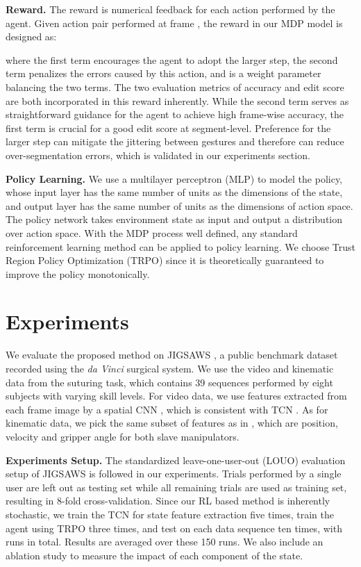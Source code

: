 \documentclass{llncs}
\begin{document}
\textbf{Reward.} The reward is numerical feedback for each action performed by the agent. Given action pair  performed at frame , the reward in our MDP model is designed as: 

where the first term encourages the agent to adopt the larger step, the second term penalizes the errors caused by this action, and  is a weight parameter balancing the two terms. The two evaluation metrics of accuracy and edit score are both incorporated in this reward inherently. While the second term serves as straightforward guidance for the agent to achieve high frame-wise accuracy, the first term is crucial for a good edit score at segment-level. Preference for the larger step can mitigate the jittering between gestures and therefore can reduce over-segmentation errors, which is validated in our experiments section. 

\textbf{Policy Learning.} We use a multilayer perceptron (MLP) to model the policy, whose input layer has the same number of units as the dimensions of the state, and output layer has the same number of units as the dimensions of action space. The policy network takes environment state as input and output a distribution over action space. With the MDP process well defined, any standard reinforcement learning method can be applied to policy learning. We choose Trust Region Policy Optimization (TRPO) \cite{schulman2015trust} since it is theoretically guaranteed to improve the policy monotonically. 

\section{Experiments}

We evaluate the proposed method on JIGSAWS \cite{ahmidi2017dataset,gao2014jhu}, a public benchmark dataset recorded using the {\itshape da Vinci} surgical system. We use the video and kinematic data from the suturing task, which contains 39 sequences performed by eight subjects with varying skill levels. For video data, we use features extracted from each frame image by a spatial CNN \cite{lea2016segmental}, which is consistent with TCN \cite{lea2016temporal}. As for kinematic data, we pick the same subset of features as in \cite{lea2016temporal}, which are position, velocity and gripper angle for both slave manipulators.

\textbf{Experiments Setup.} The standardized leave-one-user-out (LOUO) evaluation setup of JIGSAWS is followed in our experiments. Trials performed by a single user are left out as testing set while all remaining trials are used as training set, resulting in 8-fold cross-validation. Since our RL based method is inherently stochastic, we train the TCN for state feature extraction five times, train the agent using TRPO three times, and test on each data sequence ten times, with  runs in total. Results are averaged over these 150 runs. We also include an ablation study to measure the impact of each component of the state.
\end{document}
